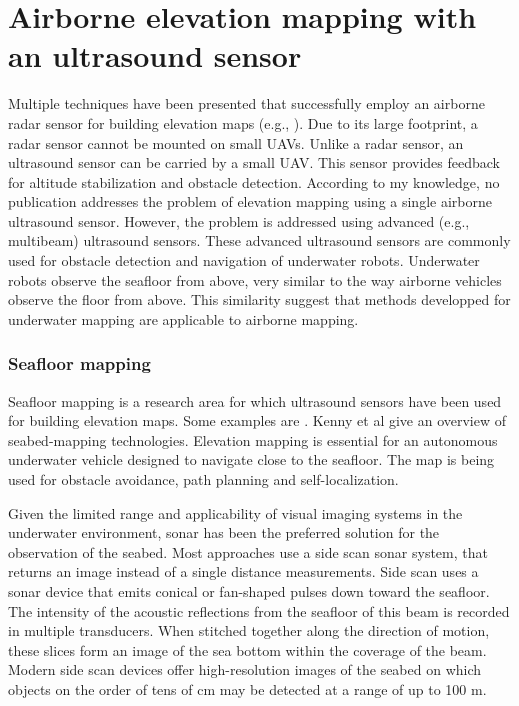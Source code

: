 \section{Airborne elevation mapping with an ultrasound sensor}
\label{sec:related-research-elevation-mapping}
Multiple techniques have been presented that successfully employ an airborne radar sensor for building elevation maps (e.g., \cite{foessel2000radar, weiß2006airborne}).
Due to its large footprint, a radar sensor cannot be mounted on small UAVs.
Unlike a radar sensor, an ultrasound sensor can be carried by a small UAV.
This sensor provides feedback for altitude stabilization and obstacle detection.
According to my knowledge, no publication addresses the problem of elevation mapping using a single airborne ultrasound sensor.
However, the problem is addressed using advanced (e.g., multibeam) ultrasound sensors.
These advanced ultrasound sensors are commonly used for obstacle detection and navigation of underwater robots.
Underwater robots observe the seafloor from above, very similar to the way airborne vehicles observe the floor from above.
This similarity suggest that methods developped for underwater mapping are applicable to airborne mapping.

\subsubsection{Seafloor mapping}
Seafloor mapping is a research area for which ultrasound sensors have been used for building elevation maps. Some examples are \cite{johnson1996seafloor,strauss1999multibeam,zerr1996three,evans2002three}.
Kenny et al \cite{kenny2003overview} give an overview of seabed-mapping technologies.
Elevation mapping is essential for an autonomous underwater vehicle designed to navigate close to the seafloor.
The map is being used for obstacle avoidance, path planning and self-localization.

Given the limited range and applicability of visual imaging systems in the underwater environment,
sonar has been the preferred solution \cite{blondel1997handbook} for the observation of the seabed.
Most approaches use a side scan sonar system, that returns an image instead of a single distance measurements.
Side scan uses a sonar device that emits conical or fan-shaped pulses down toward the seafloor.
The intensity of the acoustic reflections from the seafloor of this beam is recorded in multiple transducers.
When stitched together along the direction of motion, these slices form an image of the sea bottom within the coverage of the beam.
Modern side scan devices offer high-resolution images of the seabed on which objects on the order of tens of cm may be detected at a range of up to 100 m.

